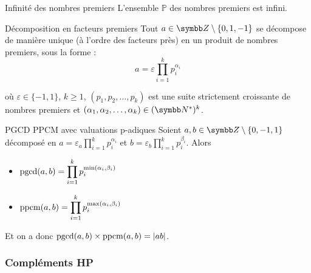\begin{proposition}{Infinité des nombres premiers}{}
    L'ensemble $\mathbb{P}$ des nombres premiers est infini.
\end{proposition}

\begin{theoreme}{Décomposition en facteurs premiers}{}
    Tout $a \in \Z \setminus \{0, 1, -1\}$ se décompose de manière unique (à l'ordre des facteurs près) en un produit
    de nombres premiers, sous la forme : 
    \[
        a = \varepsilon \prod_{i = 1}^k p_i^{\alpha_i} 
    \]

    où $\varepsilon \in \{-1, 1\}$, $k \geqslant 1$, $(p_1, p_2, \ldots, p_k)$ est une suite strictement croissante de nombres premiers
    et $(\alpha_1, \alpha_2, \ldots, \alpha_k) \in (\N^*)^k$.
    
\end{theoreme}


\lvspace \avspace \begin{proposition}{PGCD PPCM avec valuations p-adiques}{}
    Soient $a, b \in \Z \setminus \{0, -1, 1\}$ décomposé en 
    $\displaystyle a = \varepsilon_a \prod_{i = 1}^k p_i^{\alpha_i}$ et
    $\displaystyle b = \varepsilon_b \prod_{i = 1}^k p_i^{\beta_i}$. 
    Alors 
    
    \begin{itemize}
        \item $\displaystyle \operatorname{pgcd}(a, b) = \prod_{i = 1}^k p_i^{\min(\alpha_i, \beta_i)}$
        \item $\displaystyle \operatorname{ppcm}(a, b) = \prod_{i = 1}^k p_i^{\max(\alpha_i, \beta_i)}$
    \end{itemize} 
    
    Et on a donc $\displaystyle \operatorname{pgcd}(a, b) \times \operatorname{ppcm}(a, b) = |ab|$.
\end{proposition}

\subsubsection{Compléments HP}

